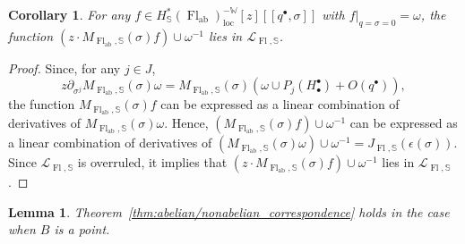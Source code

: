\documentclass[a4paper,12pt]{amsart}
\numberwithin{equation}{section}
\newtheorem{lemma}[theorem]{Lemma}
\newtheorem{corollary}[theorem]{Corollary}
\theoremstyle{definition}
\newcommand{\bbS}{\mathbb{S}}
\newcommand{\W}{\mathbb{W}}
\newcommand{\cL}{\mathcal{L}}
\newcommand{\loc}{{\operatorname{loc}}}
\newcommand{\Fl}{\operatorname{Fl}}
\newcommand{\FlG}{\operatorname{Fl}}
\newcommand{\FlT}{\operatorname{Fl}_{\operatorname{ab}}}
\begin{document}
\begin{corollary}\label{cor:CFKS}
    For any $f\in H^*_\bbS(\FlT)^{-\W}_\loc[z][\![q^\bullet,\sigma]\!]$ with $f|_{q=\sigma=0}=\omega$, the function $(z\cdot M_{\FlT,\bbS}(\sigma)f) \cup \omega^{-1}$ lies in $\cL_{\FlG,\bbS}$.
\end{corollary}

\begin{proof}
    Since, for any $j\in J$,
    \[
    z\partial_{\sigma^j}M_{\FlT,\bbS}(\sigma)\omega = M_{\FlT,\bbS}(\sigma) (\omega \cup P_j(H^\bullet_\bullet) + O(q^\bullet)),
    \]
    the function $M_{\FlT,\bbS}(\sigma)f$ can be expressed as a linear combination of derivatives of $M_{\FlT,\bbS}(\sigma)\omega$.
    Hence, $(M_{\FlT,\bbS}(\sigma)f)\cup\omega^{-1}$ can be expressed as a linear combination of derivatives of $(M_{\FlT,\bbS}(\sigma)\omega)\cup\omega^{-1}=J_{\Fl,\bbS}(\epsilon(\sigma))$.
    Since $\cL_{\Fl,\bbS}$ is overruled, it implies that $(z\cdot M_{\FlT,\bbS}(\sigma)f) \cup \omega^{-1}$ lies in $\cL_{\FlG,\bbS}$.
\end{proof}

\begin{lemma} \label{lemma:ab/nonab for flag}
Theorem~\ref{thm:abelian/nonabelian_correspondence} holds in the case when $B$ is a point. 
\end{lemma}
\end{document}
